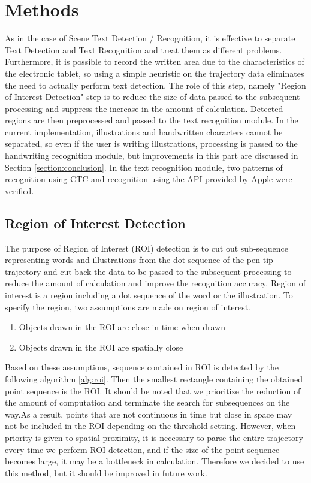 \section{Methods}
\label{section:methods}

As in the case of Scene Text Detection / Recognition, it is effective to separate Text Detection
and Text Recognition and treat them as different problems.
Furthermore, it is possible to record the written area due to the characteristics of the electronic tablet,
so using a simple heuristic on the trajectory data eliminates the need to actually perform text detection.
The role of this step, namely "Region of Interest Detection" step is to reduce the size of data
passed to the subsequent processing and suppress the increase in the amount of calculation.
Detected regions are then preprocessed and passed to the text recognition module.
In the current implementation, illustrations and handwritten characters cannot be separated,
so even if the user is writing illustrations, processing is passed to the handwriting recognition module,
but improvements in this part are discussed in Section \ref{section:conclusion}.
In the text recognition module,
two patterns of recognition using CTC and recognition using the API provided by Apple were verified.

\subsection{Region of Interest Detection}

The purpose of Region of Interest (ROI) detection is to cut out sub-sequence
representing words and illustrations from the dot sequence of the pen tip trajectory
and cut back the data to be passed to the subsequent processing to
reduce the amount of calculation and improve the recognition accuracy.
Region of interest is a region including a dot sequence of the word or the illustration.
To specify the region, two assumptions are made on region of interest.

\begin{enumerate}
    \item Objects drawn in the ROI are close in time when drawn
    \item Objects drawn in the ROI are spatially close
\end{enumerate}

Based on these assumptions, sequence contained in ROI is detected by the following algorithm \ref{alg:roi}.
Then the smallest rectangle containing the obtained point sequence is the ROI.
It should be noted that we prioritize the reduction of the amount of computation and
terminate the search for subsequences on the way.As a result, points that are not continuous
in time but close in space may not be included in the ROI depending on the threshold setting.
However, when priority is given to spatial proximity, it is necessary to parse the entire
trajectory every time we perform ROI detection, and if the size of the point sequence becomes large,
it may be a bottleneck in calculation. Therefore we decided to use this method, but it should
be improved in future work.

